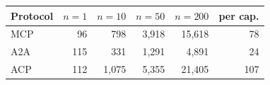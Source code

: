 \begin{tabular}{lrrrrr}
\toprule
Protocol & $n{=}1$ & $n{=}10$ & $n{=}50$ & $n{=}200$ & per cap. \\
\midrule
MCP & 96 & 798 & 3,918 & 15,618 & 78 \\
A2A & 115 & 331 & 1,291 & 4,891 & 24 \\
ACP & 112 & 1,075 & 5,355 & 21,405 & 107 \\
\bottomrule
\end{tabular}